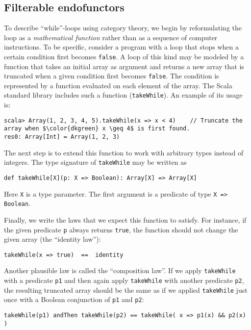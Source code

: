 \subsection{Filterable endofunctors}

To describe \textsf{``}while\textsf{''}-loops using category theory, we begin by reformulating
the loop as a \emph{mathematical function} rather than as a sequence
of computer instructions. To be specific, consider a program with
a loop that stops when a certain condition first becomes \lstinline!false!.
A loop of this kind may be modeled by a function that takes an initial
array as argument and returns a new array that is truncated when a
given condition first becomes \lstinline!false!. The condition is
represented by a function evaluated on each element of the array.
The Scala standard library includes such a function (\lstinline!takeWhile!).
An example of its usage is:
\begin{lstlisting}[mathescape=true]
scala> Array(1, 2, 3, 4, 5).takeWhile(x => x < 4)    // Truncate the array when $\color{dkgreen} x \geq 4$ is first found.
res0: Array[Int] = Array(1, 2, 3) 
\end{lstlisting}
The next step is to extend this function to work with arbitrary types
instead of integers. The type signature of \lstinline!takeWhile!
may be written as
\begin{lstlisting}
def takeWhile[X](p: X => Boolean): Array[X] => Array[X]
\end{lstlisting}
Here \lstinline!X! is a type parameter. The first argument is a predicate
of type \lstinline!X => Boolean!.

Finally, we write the laws that we expect this function to satisfy.
For instance, if the given predicate \lstinline!p! always returns
\lstinline!true!, the function should not change the given array
(the \textsf{``}identity law\textsf{''}):
\begin{lstlisting}
takeWhile(x => true)  ==  identity
\end{lstlisting}
Another plausible law is called the \textsf{``}composition law\textsf{''}. If we apply
\lstinline!takeWhile! with a predicate \lstinline!p1! and then again
apply \lstinline!takeWhile! with another predicate \lstinline!p2!,
the resulting truncated array should be the same as if we applied
\lstinline!takeWhile! just once with a Boolean conjunction of \lstinline!p1!
and \lstinline!p2!: 
\begin{lstlisting}
takeWhile(p1) andThen takeWhile(p2) == takeWhile( x => p1(x) && p2(x) )
\end{lstlisting}


